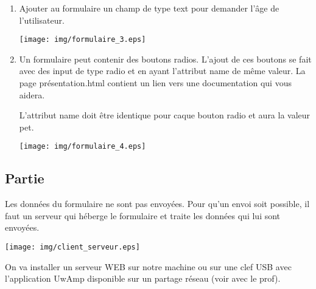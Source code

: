 \documentclass[11pt,a4paper]{article}
\newcounter{numexo}
\begin{document}
\begin{enumerate}
\item Ajouter au formulaire un champ de type \textsf{text} pour demander l'âge de l'utilisateur.
\begin{center}
\texttt{[image: img/formulaire\_3.eps]}
\end{center}
\item Un formulaire peut contenir des boutons radios. L'ajout de ces boutons se fait avec des \textsf{input} de type \textsf{radio} et en ayant l'attribut \textsf{name} de même valeur. La page \textsf{présentation.html} contient un lien vers une documentation qui vous aidera.

L'attribut \textsf{name} doit être identique pour caque bouton radio et aura la valeur \textsf{pet}.
\begin{center}
\texttt{[image: img/formulaire\_4.eps]}
\end{center}


\end{enumerate}

\newpage
\addtocounter{numexo}{1}
\subsection*{\Large Partie \thenumexo }

Les données du formulaire ne sont pas envoyées. Pour qu'un envoi soit possible, il faut un serveur qui héberge le formulaire et traite les données qui lui sont envoyées.

\begin{center}
\texttt{[image: img/client\_serveur.eps]}
\end{center}

On va installer un serveur WEB sur notre machine ou sur une clef USB avec l'application UwAmp disponible sur un partage réseau (voir avec le prof).
\end{document}
